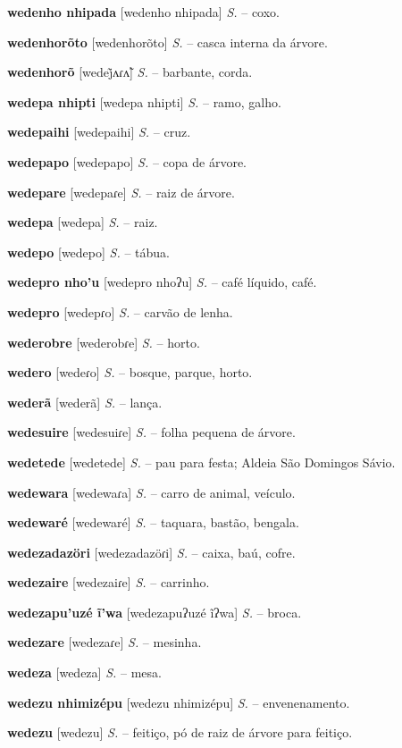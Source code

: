 \textbf{wedenho nhipada} [wedenho nhipada] \textit{S.} -- coxo.

\textbf{wedenhorõto} [wedenhorõto] \textit{S.} -- casca interna da árvore.

\textbf{wedenhorõ} [wedej̃ʌɾʌ̃] \textit{S.} -- barbante, corda.

\textbf{wedepa nhipti} [wedepa nhipti] \textit{S.} -- ramo, galho.

\textbf{wedepaihi} [wedepaihi] \textit{S.} -- cruz.

\textbf{wedepapo} [wedepapo] \textit{S.} -- copa de árvore.

\textbf{wedepare} [wedepaɾe] \textit{S.} -- raiz de árvore.

\textbf{wedepa} [wedepa] \textit{S.} -- raiz.

\textbf{wedepo} [wedepo] \textit{S.} -- tábua.

\textbf{wedepro nho'u} [wedepro nhoʔu] \textit{S.} -- café líquido, café.

\textbf{wedepro} [wedepɾo] \textit{S.} -- carvão de lenha.

\textbf{wederobre} [wederobɾe] \textit{S.} -- horto.

\textbf{wedero} [wedeɾo] \textit{S.} -- bosque, parque, horto.

\textbf{wederã} [wederã] \textit{S.} -- lança.

\textbf{wedesuire} [wedesuiɾe] \textit{S.} -- folha pequena de árvore.

\textbf{wedetede} [wedetede] \textit{S.} -- pau para festa; Aldeia São Domingos Sávio.

\textbf{wedewara} [wedewaɾa] \textit{S.} -- carro de animal, veículo.

\textbf{wedewaré} [wedewaré] \textit{S.} -- taquara, bastão, bengala.

\textbf{wedezadazöri} [wedezadazöɾi] \textit{S.} -- caixa, baú, cofre.

\textbf{wedezaire} [wedezaiɾe] \textit{S.} -- carrinho.

\textbf{wedezapu'uzé ĩ'wa} [wedezapuʔuzé ĩʔwa] \textit{S.} -- broca.

\textbf{wedezare} [wedezaɾe] \textit{S.} -- mesinha.

\textbf{wedeza} [wedeza] \textit{S.} -- mesa.

\textbf{wedezu nhimizépu} [wedezu nhimizépu] \textit{S.} -- envenenamento.

\textbf{wedezu} [wedezu] \textit{S.} -- feitiço, pó de raiz de árvore para feitiço.

